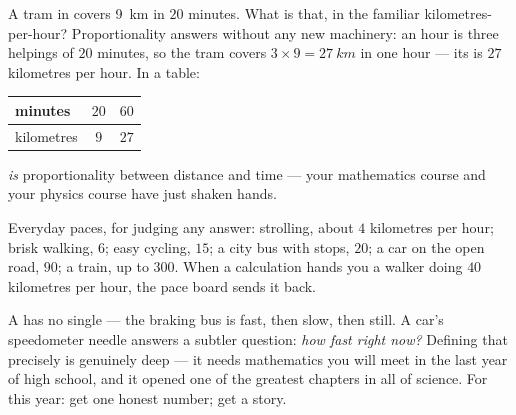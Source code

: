 \begin{example}\label{ex:g6:describing-motion:proportion}
A tram in  covers \qty{9}{km} in $20$ minutes. What
 is that, in the familiar kilometres-per-hour? Proportionality
answers without any new machinery: an hour is three helpings of
$20$ minutes, so the tram covers $3 \times 9 = \qty{27}{km}$ in
one hour --- its  is $27$ kilometres per hour. In a table:
\begin{center}
\begin{tabular}{l|cc}
minutes & $20$ & $60$ \\
\hline
kilometres & $9$ & $27$
\end{tabular}
\end{center}
 \emph{is} proportionality between distance and
time --- your mathematics course and your physics course have just
shaken hands.
\end{example}

\begin{example}\label{ex:g6:describing-motion:paces}
Everyday paces, for judging any answer: strolling, about $4$
kilometres per hour; brisk walking, $6$; easy cycling, $15$; a
city bus with stops, $20$; a car on the open road, $90$; a
 train, up to $300$. When a calculation hands you a
walker doing $40$ kilometres per hour, the pace board sends it
back.
\end{example}

\begin{remark}\label{rem:g6:describing-motion:instant}
A  has no single  --- the braking bus is fast,
then slow, then still. A car's speedometer needle answers a
subtler question: \emph{how fast right now?} Defining that
 precisely is genuinely deep --- it needs mathematics
you will meet in the last year of high school, and it opened one
of the greatest chapters in all of science. For this year:  get one honest number;  get a story.
\end{remark}

